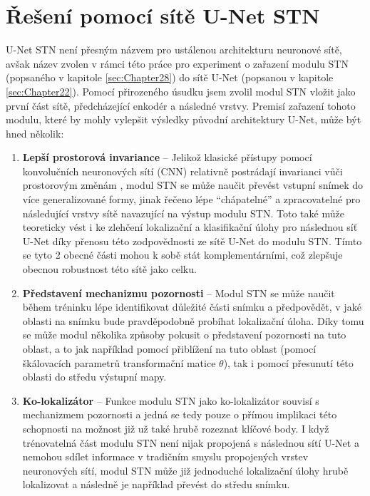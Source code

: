 \section{Řešení pomocí sítě U-Net STN}
\label{sec:Chapter45}
U-Net STN není přesným názvem pro ustálenou architekturu neuronové sítě, avšak název zvolen v rámci této práce pro experiment o zařazení modulu STN (popsaného v kapitole \ref{sec:Chapter28}) do sítě U-Net (popsanou v kapitole \ref{sec:Chapter22}). Pomocí přirozeného úsudku jsem zvolil modul STN vložit jako první část sítě, předcházející enkodér a následné vrstvy. Premisí zařazení tohoto modulu, které by mohly vylepšit výsledky původní architektury U-Net, může být hned několik:
\begin{enumerate}
    \item \textbf{Lepší prostorová invariance} -- Jelikož klasické přístupy pomocí konvolučních neuronových sítí (CNN) relativně postrádají invarianci vůči prostorovým změnám \cite{stn}, modul STN se může naučit převést vstupní snímek do více generalizované formy, jinak řečeno lépe \enquote{chápatelné} a zpracovatelné pro následující vrstvy sítě navazující na výstup modulu STN. Toto také může teoreticky vést i ke zlehčení lokalizační a klasifikační úlohy pro následnou síť U-Net díky přenosu této zodpovědnosti ze sítě U-Net do modulu STN. Tímto se tyto 2 obecné části mohou k sobě stát komplementárními, což zlepšuje obecnou robustnost této sítě jako celku.
    \item \textbf{Představení mechanizmu pozornosti} -- Modul STN se může naučit během tréninku lépe identifikovat důležité části snímku a předpovědět, v jaké oblasti na snímku bude pravděpodobně probíhat lokalizační úloha. Díky tomu se může modul několika způsoby pokusit o představení pozornosti na tuto oblast, a to jak například pomocí přiblížení na tuto oblast (pomocí škálovacích parametrů transformační matice $\theta$), tak i pomocí přesunutí této oblasti do středu výstupní mapy.
    \item \textbf{Ko-lokalizátor} -- Funkce modulu STN jako ko-lokalizátor souvisí s mechanizmem pozornosti a jedná se tedy pouze o přímou implikaci této schopnosti na možnost již už také hrubě rozeznat klíčové body. I když trénovatelná část modulu STN není nijak propojená s následnou sítí U-Net a nemohou sdílet informace v tradičním smyslu propojených vrstev neuronových sítí, modul STN může již jednoduché lokalizační úlohy hrubě lokalizovat a následně je například převést do středu snímku.
\end{enumerate}

